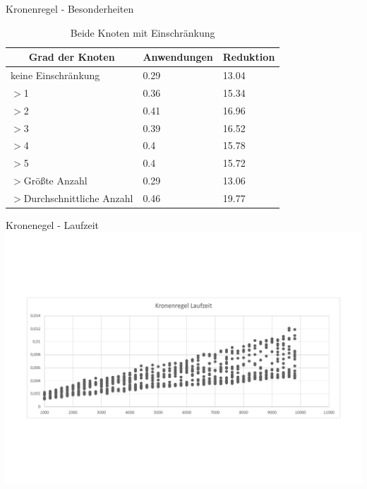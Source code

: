 \documentclass{beamer}
\begin{document}
\begin{frame}{Kronenregel - Besonderheiten}
\begin{table}[htb]
\caption{Beide Knoten mit Einschränkung\label{tab:degreeAND}}
\vspace*{1em}
\centering

\bgroup
\def\arraystretch{1.3}%

\begin{tabular}[c]{l|l|l}
	
	\multicolumn{1}{c|}{\textbf{Grad der Knoten}} & 
	\multicolumn{1}{c|}{\textbf{Anwendungen}} & 
	\multicolumn{1}{c}{\textbf{Reduktion}} \\ 
	
	\hline

	keine Einschränkung&0.29&13.04\\
	$>$1&0.36 &15.34 \\
	$>$2&0.41 &16.96 \\
	$>$3& 0.39& 16.52 \\
	$>$4& 0.4 &15.78 \\
	$>$5& 0.4 & 15.72\\  
	$>$Größte Anzahl& 0.29 &13.06 \\
	$>$Durchschnittliche Anzahl& 0.46&19.77 \\
	
\end{tabular}
\egroup

\end{table}
\end{frame}

\begin{frame}{Kronenegel - Laufzeit}
\includegraphics[scale= .4]{analysis1000_CrownNormal_runtime.pdf} 
\end{frame}
\end{document}

